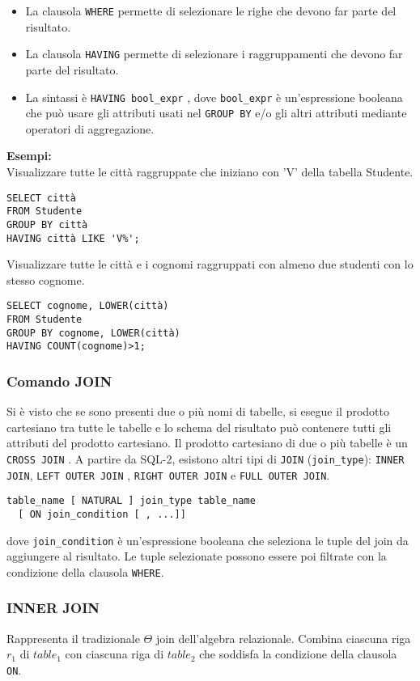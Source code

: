 \documentclass[a4paper, 10pt]{article}
\begin{document}
		\begin{itemize}
			\item La clausola \lstinline|WHERE| permette di selezionare le righe che devono far parte
			del risultato.
			\item La clausola \lstinline|HAVING| permette di selezionare i raggruppamenti che
			devono far parte del risultato.
			\item La sintassi è \lstinline|HAVING bool_expr| , dove \lstinline|bool_expr| è un'espressione
			booleana che può usare gli attributi usati nel \lstinline|GROUP BY| e/o gli altri
			attributi mediante operatori di aggregazione.
		\end{itemize}
		\textbf{Esempi: }\\
		Visualizzare tutte le città raggruppate che iniziano con ’V’ della tabella
		Studente.
		\begin{lstlisting}
SELECT città
FROM Studente
GROUP BY città
HAVING città LIKE 'V%';
		\end{lstlisting}
		Visualizzare tutte le città e i cognomi raggruppati con almeno due studenti
		con lo stesso cognome.
		\begin{lstlisting}
SELECT cognome, LOWER(città)
FROM Studente
GROUP BY cognome, LOWER(città)
HAVING COUNT(cognome)>1;
		\end{lstlisting}
		
		\subsubsection{Comando JOIN}
			Si è visto che se sono presenti due o più nomi di tabelle, si esegue il
			prodotto cartesiano tra tutte le tabelle e lo schema del risultato può
			contenere tutti gli attributi del prodotto cartesiano.
			Il prodotto cartesiano di due o più tabelle è un \lstinline|CROSS JOIN| .
			A partire da SQL-2, esistono altri tipi di \lstinline|JOIN| (\lstinline|join_type|):
			\lstinline|INNER JOIN|, \lstinline|LEFT OUTER JOIN| , \lstinline|RIGHT OUTER JOIN| e \lstinline|FULL OUTER JOIN|.
			
			\begin{lstlisting}
table_name [ NATURAL ] join_type table_name 
  [ ON join_condition [ , ...]]
			\end{lstlisting}
			dove \lstinline|join_condition| è un’espressione booleana che seleziona le tuple del join
			da aggiungere al risultato. Le tuple selezionate possono essere poi filtrate
			con la condizione della clausola \lstinline|WHERE|.
\subsubsection*{INNER JOIN}
			Rappresenta il tradizionale $ \Theta $ join dell’algebra relazionale.
			Combina ciascuna riga $ r_1 $ di $ table_1 $ con ciascuna riga di $ table_2 $ che
			soddisfa la condizione della clausola \lstinline|ON|.
			
\end{document}
